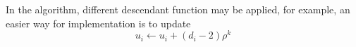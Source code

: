             In the algorithm, different descendant function may be applied, for example, an easier way for implementation is to update
            \begin{equation*}
                u_i \gets u_i + (d_i - 2) \rho^k
            \end{equation*}

